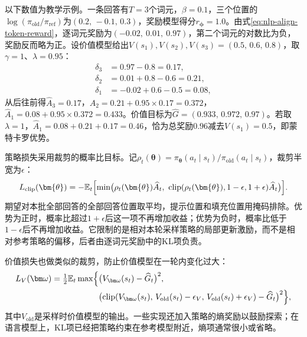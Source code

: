 \begin{example}[三个词元的逐词元奖励与GAE]
  \label{ex:nlp-align-gae}
  以下数值为教学示例。一条回答有$T=3$个词元，$\beta=0.1$，三个位置的$\log(\pi_{\mathrm{old}}/\pi_{\mathrm{ref}})$为$(0.2,\,-0.1,\,0.3)$，奖励模型得分$r_{\bm\phi}=1.0$。由式\eqref{eq:nlp-align-token-reward}，逐词元奖励为$(-0.02,\ 0.01,\ 0.97)$，第二个词元的对数比为负，奖励反而略为正。设价值模型给出$V(s_1),V(s_2),V(s_3)=(0.5,\,0.6,\,0.8)$，取$\gamma=1$、$\lambda=0.95$：
  \[
   \begin{aligned}
   \delta_3&=0.97-0.8=0.17,\\
   \delta_2&=0.01+0.8-0.6=0.21,\\
   \delta_1&=-0.02+0.6-0.5=0.08,
   \end{aligned}
  \]
  从后往前得$\widehat A_3=0.17$，$\widehat A_2=0.21+0.95\times0.17=0.372$，$\widehat A_1=0.08+0.95\times0.372=0.433$。价值目标为$\widehat G=(0.933,\,0.972,\,0.97)$。若取$\lambda=1$，$\widehat A_1=0.08+0.21+0.17=0.46$，恰为总奖励$0.96$减去$V(s_1)=0.5$，即蒙特卡罗优势。
\end{example}

策略损失采用裁剪的概率比目标。记$\rho_t(\bm\theta)=\pi_{\bm\theta}(a_t\mid s_t)/\pi_{\mathrm{old}}(a_t\mid s_t)$，裁剪半宽为$\epsilon$：
\begin{equation}
\label{eq:nlp-align-ppo}
 L_{\mathrm{clip}}(\bm{\theta})
 =-\mathbb{E}_t\Bigl[\min\bigl(\rho_t(\bm{\theta})\widehat{A}_t,\
   \operatorname{clip}(\rho_t(\bm{\theta}),1-\epsilon,1+\epsilon)\widehat{A}_t\bigr)\Bigr].
\end{equation}
期望对本批全部回答的全部回答位置取平均，提示位置和填充位置用掩码排除。优势为正时，概率比超过$1+\epsilon$后这一项不再增加收益；优势为负时，概率比低于$1-\epsilon$后不再增加收益。它限制的是相对本轮采样策略的局部更新激励，而不是相对参考策略的偏移，后者由逐词元奖励中的KL项负责。

价值损失也做类似的裁剪，防止价值模型在一轮内变化过大：
\begin{equation}
\label{eq:nlp-align-value-loss}
\begin{aligned}
 L_V(\bm\omega)=\tfrac12\mathbb E_t\max\Bigl\{&\bigl(V_{\bm\omega}(s_t)-\widehat G_t\bigr)^2,\\
 &\bigl(\operatorname{clip}(V_{\bm\omega}(s_t),\,V_{\mathrm{old}}(s_t)-\epsilon_V,\,V_{\mathrm{old}}(s_t)+\epsilon_V)-\widehat G_t\bigr)^2\Bigr\},
\end{aligned}
\end{equation}
其中$V_{\mathrm{old}}$是采样时价值模型的输出。一些实现还加入策略的熵奖励以鼓励探索；在语言模型上，KL项已经把策略约束在参考模型附近，熵项通常很小或省略。

